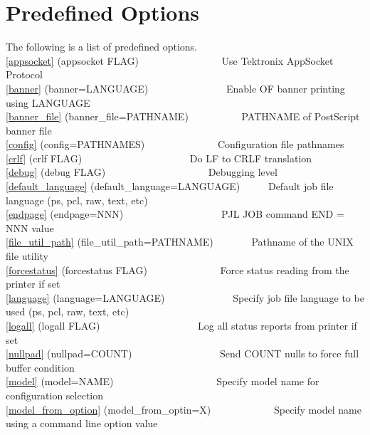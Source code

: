 \documentclass[a4paper]{article}
\begin{document}
\section{Predefined Options}

The following is a list of predefined options. \\ 
{\ttfamily \ref{appsocket} {(appsocket FLAG)}}{\ttfamily ~~~~~~~~~~~~~~~~} Use Tektronix AppSocket Protocol \\ 
{\ttfamily \ref{banner} {(banner=LANGUAGE)}}{\ttfamily ~~~~~~~~~~~~~~~} Enable OF banner printing using LANGUAGE \\ 
{\ttfamily \ref{banner_file} {(banner\_file=PATHNAME)}}{\ttfamily ~~~~~~~~~~} PATHNAME of PostScript banner file \\ 
{\ttfamily \ref{config} {(config=PATHNAMES)}}{\ttfamily ~~~~~~~~~~~~~~} Configuration file pathnames \\ 
{\ttfamily \ref{crlf} {(crlf FLAG)}}{\ttfamily ~~~~~~~~~~~~~~~~~~~~~} Do LF to CRLF translation \\ 
{\ttfamily \ref{debug} {(debug FLAG)}}{\ttfamily ~~~~~~~~~~~~~~~~~~~~} Debugging level \\ 
{\ttfamily \ref{default_language} {(default\_language=LANGUAGE)}}{\ttfamily ~~~~~} Default job file language (ps, pcl, raw, text, etc) \\ 
{\ttfamily \ref{endpage} {(endpage=NNN)}}{\ttfamily ~~~~~~~~~~~~~~~~~~~} PJL JOB command END = NNN value \\ 
{\ttfamily \ref{file_util_path} {(file\_util\_path=PATHNAME)}}{\ttfamily ~~~~~~~} Pathname of the UNIX file utility \\ 
{\ttfamily \ref{forcestatus} {(forcestatus FLAG)}}{\ttfamily ~~~~~~~~~~~~~~} Force status reading from the printer if set \\ 
{\ttfamily \ref{language} {(language=LANGUAGE)}}{\ttfamily ~~~~~~~~~~~~~} Specify job file language to be used (ps, pcl, raw, text, etc) \\ 
{\ttfamily \ref{logall} {(logall FLAG)}}{\ttfamily ~~~~~~~~~~~~~~~~~~~} Log all status reports from printer if set \\ 
{\ttfamily \ref{nullpad} {(nullpad=COUNT)}}{\ttfamily ~~~~~~~~~~~~~~~~~} Send COUNT nulls to force full buffer condition \\ 
{\ttfamily \ref{model} {(model=NAME)}}{\ttfamily ~~~~~~~~~~~~~~~~~~~~} Specify model name for configuration selection \\ 
{\ttfamily \ref{model_from_option} {(model\_from\_optin=X)}}{\ttfamily ~~~~~~~~~~~~} Specify model name using a command line option value \\ 
\end{document}

